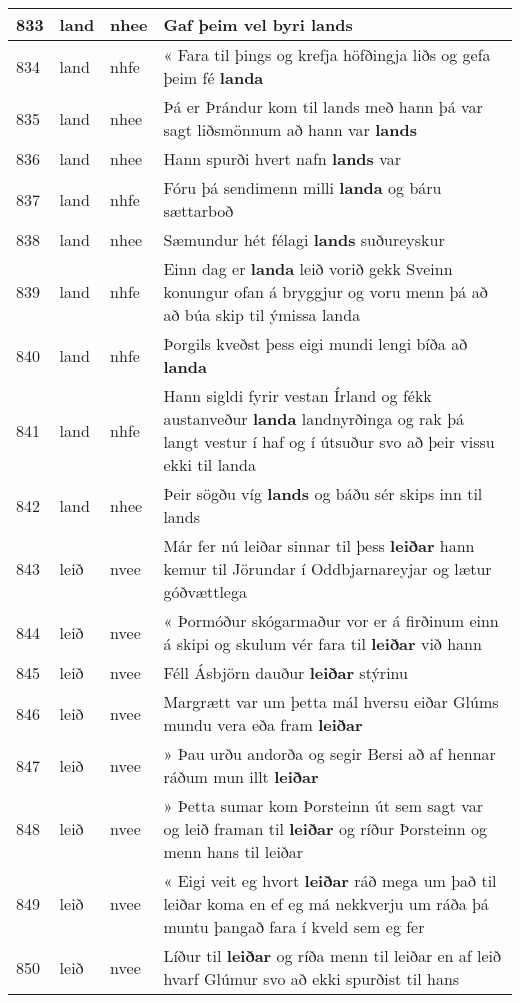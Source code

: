\documentclass{article}
\begin{document}
\begin{longtable}{p{1cm}|p{1cm}|p{1cm}|p{13cm}}
\hline
833&land&nhee&Gaf þeim vel byri \textbf{lands} \\
\hline
834&land&nhfe&« Fara til þings og krefja höfðingja liðs og gefa þeim fé \textbf{landa} \\
\hline
835&land&nhee&Þá er Þrándur kom til lands með hann þá var sagt liðsmönnum að hann var \textbf{lands} \\
\hline
836&land&nhee&Hann spurði hvert nafn \textbf{lands} var\\
\hline
837&land&nhfe&Fóru þá sendimenn milli \textbf{landa} og báru sættarboð\\
\hline
838&land&nhee&Sæmundur hét félagi \textbf{lands} suðureyskur\\
\hline
839&land&nhfe&Einn dag er \textbf{landa} leið vorið gekk Sveinn konungur ofan á bryggjur og voru menn þá að að búa skip til ýmissa landa\\
\hline
840&land&nhfe&Þorgils kveðst þess eigi mundi lengi bíða að \textbf{landa} \\
\hline
841&land&nhfe&Hann sigldi fyrir vestan Írland og fékk austanveður \textbf{landa} landnyrðinga og rak þá langt vestur í haf og í útsuður svo að þeir vissu ekki til landa\\
\hline
842&land&nhee&Þeir sögðu víg \textbf{lands} og báðu sér skips inn til lands\\
\hline
843&leið&nvee&Már fer nú leiðar sinnar til þess \textbf{leiðar} hann kemur til Jörundar í Oddbjarnareyjar og lætur góðvættlega\\
\hline
844&leið&nvee&« Þormóður skógarmaður vor er á firðinum einn á skipi og skulum vér fara til \textbf{leiðar} við hann\\
\hline
845&leið&nvee&Féll Ásbjörn dauður \textbf{leiðar} stýrinu\\
\hline
846&leið&nvee&Margrætt var um þetta mál hversu eiðar Glúms mundu vera eða fram \textbf{leiðar} \\
\hline
847&leið&nvee&» Þau urðu andorða og segir Bersi að af hennar ráðum mun illt \textbf{leiðar} \\
\hline
848&leið&nvee&» Þetta sumar kom Þorsteinn út sem sagt var og leið framan til \textbf{leiðar} og ríður Þorsteinn og menn hans til leiðar\\
\hline
849&leið&nvee&« Eigi veit eg hvort \textbf{leiðar} ráð mega um það til leiðar koma en ef eg má nekkverju um ráða þá muntu þangað fara í kveld sem eg fer\\
\hline
850&leið&nvee&Líður til \textbf{leiðar} og ríða menn til leiðar en af leið hvarf Glúmur svo að ekki spurðist til hans\\

\end{longtable}
\end{document}

